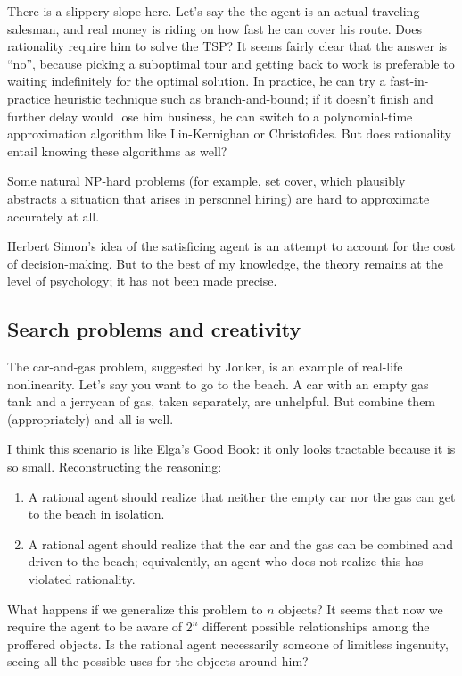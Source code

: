\documentclass[letterpaper,12pt]{article}
\begin{document}
There is a slippery slope here. Let's say the the agent is an actual traveling salesman, and real money is riding on how fast he can cover his route. Does rationality require him to solve the TSP? It seems fairly clear that the answer is ``no'', because picking a suboptimal tour and getting back to work is preferable to waiting indefinitely for the optimal solution. In practice, he can try a fast-in-practice heuristic technique such as branch-and-bound; if it doesn't finish and further delay would lose him business, he can switch to a polynomial-time approximation algorithm like Lin-Kernighan or Christofides. But does rationality entail knowing these algorithms as well?

Some natural NP-hard problems (for example, set cover, which plausibly abstracts a situation that arises in personnel hiring) are hard to approximate accurately at all.

Herbert Simon's idea of the satisficing agent is an attempt to account for the cost of decision-making. But to the best of my knowledge, the theory remains at the level of psychology; it has not been made precise.

\subsection{Search problems and creativity}
The car-and-gas problem, suggested by Jonker, is an example of real-life nonlinearity. Let's say you want to go to the beach. A car with an empty gas tank and a jerrycan of gas, taken separately, are unhelpful. But combine them (appropriately) and all is well.

I think this scenario is like Elga's Good Book: it only looks tractable because it is so small. Reconstructing the reasoning:
\begin{enumerate}
\item
A rational agent should realize that neither the empty car nor the gas can get to the beach in isolation.
\item
A rational agent should realize that the car and the gas can be combined and driven to the beach; equivalently, an agent who does not realize this has violated rationality.
\end{enumerate}

What happens if we generalize this problem to $n$ objects? It seems that now we require the agent to be aware of $2^n$ different possible relationships among the proffered objects. Is the rational agent necessarily someone of limitless ingenuity, seeing all the possible uses for the objects around him?
\end{document}
